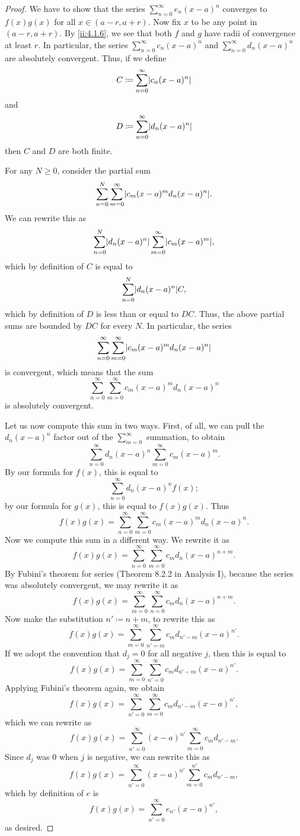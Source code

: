 \begin{proof}
  We have to show that the series \(\sum_{n = 0}^\infty e_n (x - a)^n\) converges to \(f(x) g(x)\) for all \(x \in (a - r, a + r)\).
  Now fix \(x\) to be any point in \((a - r, a + r)\).
  By \cref{ii:4.1.6}, we see that both \(f\) and \(g\) have radii of convergence at least \(r\).
  In particular, the series \(\sum_{n = 0}^\infty c_n (x - a)^n\) and \(\sum_{n = 0}^\infty d_n (x - a)^n\) are absolutely convergent.
  Thus, if we define
  \[
    C \coloneqq \sum_{n = 0}^\infty \abs{c_n (x - a)^n}
  \]
  and
  \[
    D \coloneqq \sum_{n = 0}^\infty \abs{d_n (x - a)^n}
  \]
  then \(C\) and \(D\) are both finite.

  For any \(N \geq 0\), consider the partial sum
  \[
    \sum_{n = 0}^N \sum_{m = 0}^\infty \abs{c_m (x - a)^m d_n (x - a)^n}.
  \]
  We can rewrite this as
  \[
    \sum_{n = 0}^N \abs{d_n (x - a)^n} \sum_{m = 0}^\infty \abs{c_m (x - a)^m},
  \]
  which by definition of \(C\) is equal to
  \[
    \sum_{n = 0}^N \abs{d_n (x - a)^n} C,
  \]
  which by definition of \(D\) is less than or equal to \(DC\).
  Thus, the above partial sums are bounded by \(DC\) for every \(N\).
  In particular, the series
  \[
    \sum_{n = 0}^\infty \sum_{m = 0}^\infty \abs{c_m (x - a)^m d_n (x - a)^n}
  \]
  is convergent, which means that the sum
  \[
    \sum_{n = 0}^\infty \sum_{m = 0}^\infty c_m (x - a)^m d_n (x - a)^n
  \]
  is absolutely convergent.

  Let us now compute this sum in two ways.
  First, of all, we can pull the \(d_n (x - a)^n\) factor out of the \(\sum_{m = 0}^\infty\) summation, to obtain
  \[
    \sum_{n = 0}^\infty d_n (x - a)^n \sum_{m = 0}^\infty c_m (x - a)^m.
  \]
  By our formula for \(f(x)\), this is equal to
  \[
    \sum_{n = 0}^\infty d_n (x - a)^n f(x);
  \]
  by our formula for \(g(x)\), this is equal to \(f(x) g(x)\).
  Thus
  \[
    f(x) g(x) = \sum_{n = 0}^\infty \sum_{m = 0}^\infty c_m (x - a)^m d_n (x - a)^n.
  \]
  Now we compute this sum in a different way.
  We rewrite it as
  \[
    f(x) g(x) = \sum_{n = 0}^\infty \sum_{m = 0}^\infty c_m d_n (x - a)^{n + m}.
  \]
  By Fubini's theorem for series (Theorem 8.2.2 in Analysis I), because the series was absolutely convergent, we may rewrite it as
  \[
    f(x) g(x) = \sum_{m = 0}^\infty \sum_{n = 0}^\infty c_m d_n (x - a)^{n + m}.
  \]
  Now make the substitution \(n' \coloneqq n + m\), to rewrite this as
  \[
    f(x) g(x) = \sum_{m = 0}^\infty \sum_{n' = m}^\infty c_m d_{n' - m} (x - a)^{n'}.
  \]
  If we adopt the convention that \(d_j = 0\) for all negative \(j\), then this is equal to
  \[
    f(x) g(x) = \sum_{m = 0}^\infty \sum_{n' = 0}^\infty c_m d_{n' - m} (x - a)^{n'}.
  \]
  Applying Fubini's theorem again, we obtain
  \[
    f(x) g(x) = \sum_{n' = 0}^\infty \sum_{m = 0}^\infty c_m d_{n' - m} (x - a)^{n'},
  \]
  which we can rewrite as
  \[
    f(x) g(x) = \sum_{n' = 0}^\infty (x - a)^{n'} \sum_{m = 0}^\infty c_m d_{n' - m}.
  \]
  Since \(d_j\) was \(0\) when \(j\) is negative, we can rewrite this as
  \[
    f(x) g(x) = \sum_{n' = 0}^\infty (x - a)^{n'} \sum_{m = 0}^{n'} c_m d_{n' - m},
  \]
  which by definition of \(e\) is
  \[
    f(x) g(x) = \sum_{n' = 0}^\infty e_{n'} (x - a)^{n'},
  \]
  as desired.
\end{proof}

